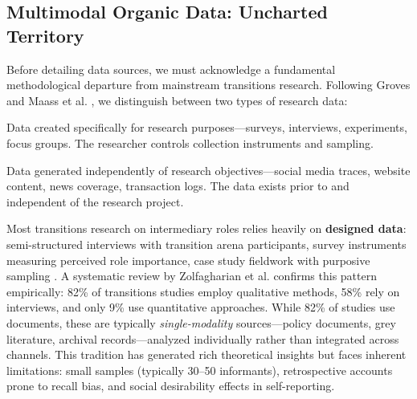 \documentclass[../main.tex]{subfiles}
\begin{document}
\subsection{Multimodal Organic Data: Uncharted Territory}

Before detailing data sources, we must acknowledge a fundamental methodological departure from mainstream transitions research. Following Groves \citeyear{groves2011three} and Maass et al. \citeyear{maass2018data}, we distinguish between two types of research data:

\begin{description}[leftmargin=0.5cm, itemsep=0.3em]
\item[Designed data] Data created specifically for research purposes---surveys, interviews, experiments, focus groups. The researcher controls collection instruments and sampling.

\item[Organic data] Data generated independently of research objectives---social media traces, website content, news coverage, transaction logs. The data exists prior to and independent of the research project.
\end{description}

Most transitions research on intermediary roles relies heavily on \textbf{designed data}: semi-structured interviews with transition arena participants, survey instruments measuring perceived role importance, case study fieldwork with purposive sampling . A systematic review by Zolfagharian et al. \citeyear{zolfagharian2019studying} confirms this pattern empirically: 82\% of transitions studies employ qualitative methods, 58\% rely on interviews, and only 9\% use quantitative approaches. While 82\% of studies use documents, these are typically \emph{single-modality} sources---policy documents, grey literature, archival records---analyzed individually rather than integrated across channels. This tradition has generated rich theoretical insights but faces inherent limitations: small samples (typically 30--50 informants), retrospective accounts prone to recall bias, and social desirability effects in self-reporting.
\end{document}
